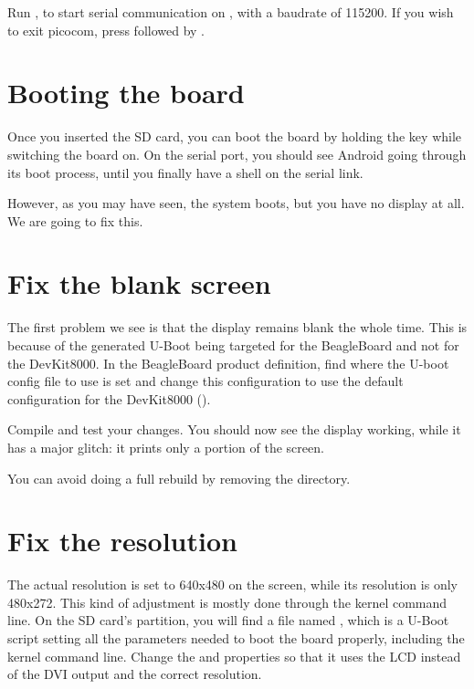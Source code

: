 Run , to start serial
communication on , with a baudrate of 115200. If
you wish to exit picocom, press \code{[Ctrl][a]} followed by
\code{[Ctrl][x]}.

\section{Booting the board}

Once you inserted the SD card, you can boot the board by 
holding the  key while switching the board on. On the
serial port, you should see Android going through its boot process, until
you finally have a shell on the serial link.

However, as you may have seen, the system boots, but you have no display at
all. We are going to fix this.

\section{Fix the blank screen}

The first problem we see is that the display remains blank the whole time. This
is because of the generated U-Boot being targeted for the BeagleBoard and not
for the DevKit8000. In the BeagleBoard product definition, find where the U-boot
config file to use is set and change this configuration to use the default
configuration for the DevKit8000 ().

Compile and test your changes. You should now see the display working, while it
has a major glitch: it prints only a portion of the screen.

You can avoid doing a full rebuild by removing the
 directory.

\section{Fix the resolution}

The actual resolution is set to 640x480 on the screen, while its resolution is
only 480x272. This kind of adjustment is mostly done through the kernel
command line. On the SD card's  partition, you will find a file named
, which is a U-Boot script setting all the parameters needed
to boot the board properly, including the kernel command line. Change the
 and  properties so that it uses the LCD instead of
the DVI output and the correct resolution.

